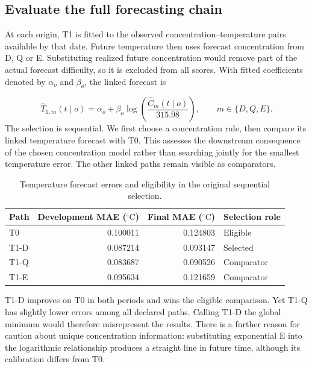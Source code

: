 \documentclass[11pt,a4paper]{article}
\newcommand{\p}[2]{#2\par}
\newcommand{\txt}[2]{#2}
\newcommand{\degC}{\ensuremath{{}^{\circ}\mathrm{C}}}
\begin{document}
\subsection{Evaluate the full forecasting chain}
\p{TEM03}{At each origin, T1 is fitted to the observed concentration--temperature pairs available by that date. Future temperature then uses forecast concentration from D, Q or E. Substituting realized future concentration would remove part of the actual forecast difficulty, so it is excluded from all scores. With fitted coefficients denoted by $\alpha_o$ and $\beta_o$, the linked forecast is}
\begin{equation}\label{eq:linked}
\widehat T_{1,m}(t\mid o)=\alpha_o+\beta_o\log\!\left(\frac{\widehat C_m(t\mid o)}{315.98}\right),\qquad m\in\{D,Q,E\}.
\end{equation}
\p{TEM04}{The selection is sequential. We first choose a concentration rule, then compare its linked temperature forecast with T0. This assesses the downstream consequence of the chosen concentration model rather than searching jointly for the smallest temperature error. The other linked paths remain visible as comparators.}
\begin{table}[H]\centering\small
\caption{\txt{TC06}{Temperature forecast errors and eligibility in the original sequential selection.}}\label{tab:temp-errors}
\begin{tabular}{lrrl}\toprule
Path & Development MAE (\degC) & Final MAE (\degC) & Selection role\\\midrule
T0 & 0.100011 & 0.124803 & Eligible\\
T1-D & 0.087214 & 0.093147 & Selected\\
T1-Q & 0.083687 & 0.090526 & Comparator\\
T1-E & 0.095634 & 0.121659 & Comparator\\\bottomrule
\end{tabular}
\end{table}
\p{TEM05}{T1-D improves on T0 in both periods and wins the eligible comparison. Yet T1-Q has slightly lower errors among all declared paths. Calling T1-D the global minimum would therefore misrepresent the results. There is a further reason for caution about unique concentration information: substituting exponential E into the logarithmic relationship produces a straight line in future time, although its calibration differs from T0.}
\end{document}
